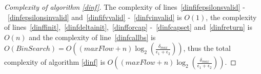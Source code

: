 \begin{proof}[Complexity of algorithm \ref{dinf}]
   The complexity of lines~\ref{dinfifepsilonsvalid} -~\ref{dinfepsilonsinvalid} and~\ref{dinfifvvalid}
   -~\ref{dinfvinvalid} is $O(1)$, the complexity of lines~\ref{dinffinit},~\ref{dinfdeltainit},~\ref{dinfforcap}
   -~\ref{dinfcapset} and~\ref{dinfreturn} is $O(n)$ and the complexity of line~\ref{dinfcallbs} is $O(BinSearch) =
   O((maxFlow + n) \log_2(\frac{\delta_{max}}{\epsilon_1 + \epsilon_2}))$, thus the total complexity of algorithm
   \ref{dinf} is $O((maxFlow + n)\log_2(\frac{\delta_{max}}{\epsilon_1 + \epsilon_2}))$.
\end{proof}
